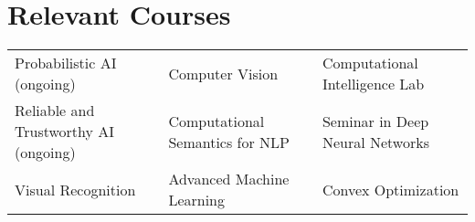 \section*{Relevant Courses}
\vspace{-1mm}
\begin{tabulary}{\textwidth}{L L L}
    Probabilistic AI {\footnotesize (ongoing)}&
    Computer Vision&
    Computational Intelligence Lab\\
    Reliable and Trustworthy AI {\footnotesize (ongoing)}&
    Computational Semantics for NLP&
    Seminar in Deep Neural Networks\\
    Visual Recognition&
    Advanced Machine Learning&
    Convex Optimization\\[-2mm]
\end{tabulary}
